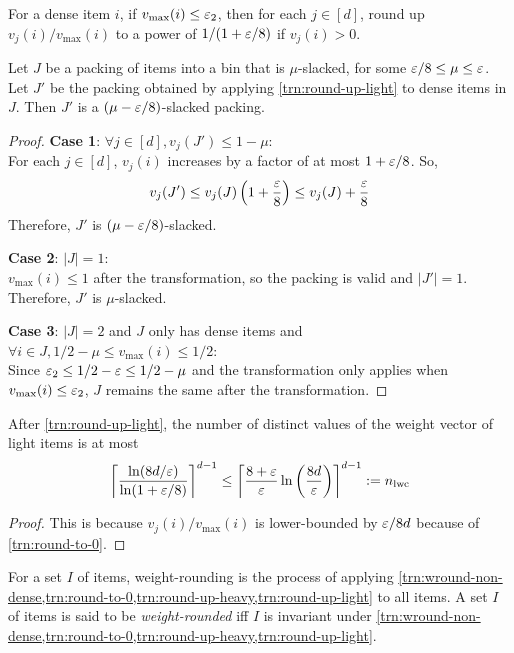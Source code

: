 \begin{transformation}
\label{trn:round-up-light}
For a dense item $i$, if $v_{\max}(i) \le \varepsilon_2$, then for each $j \in [d]$,
round up $v_j(i)/v_{\max}(i)$ to a power of $1/(1+\varepsilon/8)$ if $v_j(i) > 0$.
\end{transformation}
\begin{lemma}
\label{lem:round-up-light}
Let $J$ be a packing of items into a bin that is $\mu$-slacked, for some
$\varepsilon/8 \le \mu \le \varepsilon$.
Let $J'$ be the packing obtained by applying \cref{trn:round-up-light}
to dense items in $J$. Then $J'$ is a $(\mu-\varepsilon/8)$-slacked packing.
\end{lemma}
\begin{proof}
\textbf{Case 1}: $\forall j \in [d], v_j(J') \le 1-\mu$:\\
For each $j \in [d]$, $v_j(i)$ increases by a factor of at most $1+\varepsilon/8$.
So,
\[ v_j(J') \le v_j(J)\left(1+\frac{\varepsilon}{8}\right) \le v_j(J) + \frac{\varepsilon}{8} \]
Therefore, $J'$ is $(\mu - \varepsilon/8)$-slacked.

\textbf{Case 2}: $|J| = 1$:\\
$v_{\max}(i) \le 1$ after the transformation, so the packing is valid and $|J'| = 1$.
Therefore, $J'$ is $\mu$-slacked.

\textbf{Case 3}: $|J| = 2$ and $J$ only has dense items
and $\forall i \in J, 1/2 - \mu \le v_{\max}(i) \le 1/2$:\\
Since $\varepsilon_2 \le 1/2 - \varepsilon \le 1/2-\mu$ and
the transformation only applies when $v_{\max}(i) \le \varepsilon_2$,
$J$ remains the same after the transformation.
\end{proof}

\begin{lemma}
\label{lem:round-up-light-n}
After \cref{trn:round-up-light},
the number of distinct values of the weight vector of light items is at most
\[ \left\lceil \frac{\ln(8d/\varepsilon)}{\ln(1+\varepsilon/8)} \right\rceil^{d-1}
\le \left\lceil \frac{8+\varepsilon}{\varepsilon}\ln\left(\frac{8d}{\varepsilon}\right) \right\rceil^{d-1} := n_{\mathrm{lwc}} \]
\end{lemma}
\begin{proof}
This is because $v_j(i)/v_{\max}(i)$ is lower-bounded by $\varepsilon/8d$
because of \cref{trn:round-to-0}.
\end{proof}

\begin{transformation}
\label{trn:wround}
For a set $I$ of items, weight-rounding is the process of applying
\cref{trn:wround-non-dense,trn:round-to-0,trn:round-up-heavy,trn:round-up-light} to all items.
A set $I$ of items is said to be \emph{weight-rounded} iff $I$ is invariant under
\cref{trn:wround-non-dense,trn:round-to-0,trn:round-up-heavy,trn:round-up-light}.
\end{transformation}

